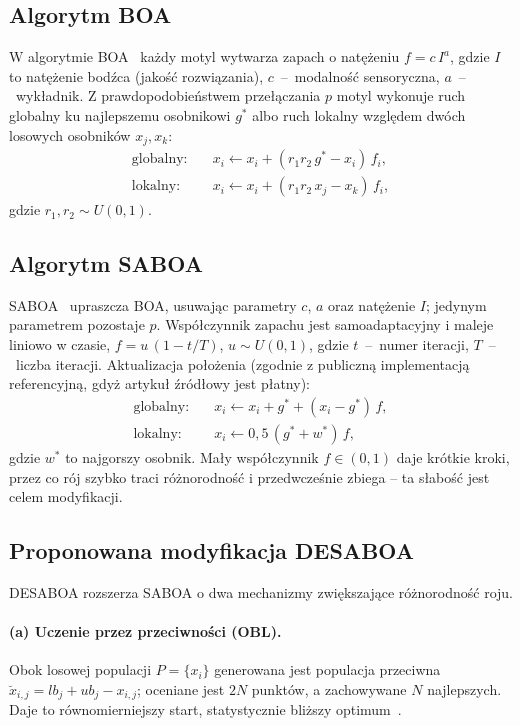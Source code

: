 \documentclass[12pt]{article}
\begin{document}
\subsection{Algorytm BOA}
W algorytmie BOA~\cite{boa} każdy motyl wytwarza zapach o natężeniu
$f = c\,I^{a}$, gdzie $I$ to natężenie bodźca (jakość rozwiązania), $c$~--~modalność
sensoryczna, $a$~--~wykładnik. Z prawdopodobieństwem przełączania $p$ motyl wykonuje
ruch globalny ku najlepszemu osobnikowi $g^{*}$ albo ruch lokalny względem dwóch
losowych osobników $x_j, x_k$:
\begin{align}
\text{globalny:}\quad & x_i \leftarrow x_i + (r_1 r_2\, g^{*} - x_i)\, f_i,\\
\text{lokalny:}\quad  & x_i \leftarrow x_i + (r_1 r_2\, x_j - x_k)\, f_i,
\end{align}
gdzie $r_1, r_2 \sim U(0,1)$.

\subsection{Algorytm SABOA}
SABOA~\cite{saboa} upraszcza BOA, usuwając parametry $c$, $a$ oraz natężenie $I$;
jedynym parametrem pozostaje $p$. Współczynnik zapachu jest samoadaptacyjny i maleje
liniowo w czasie, $f = u\,(1 - t/T)$, $u \sim U(0,1)$, gdzie $t$~--~numer iteracji,
$T$~--~liczba iteracji. Aktualizacja położenia (zgodnie z publiczną implementacją
referencyjną, gdyż artykuł źródłowy jest płatny):
\begin{align}
\text{globalny:}\quad & x_i \leftarrow x_i + g^{*} + (x_i - g^{*})\, f,\\
\text{lokalny:}\quad  & x_i \leftarrow 0{,}5\,(g^{*} + w^{*})\, f,
\end{align}
gdzie $w^{*}$ to najgorszy osobnik. Mały współczynnik $f\in(0,1)$ daje krótkie kroki,
przez co rój szybko traci różnorodność i przedwcześnie zbiega -- ta słabość jest celem
modyfikacji.

\subsection{Proponowana modyfikacja DESABOA}
DESABOA rozszerza SABOA o dwa mechanizmy zwiększające różnorodność roju.

\paragraph{(a) Uczenie przez przeciwności (OBL).}
Obok losowej populacji $P=\{x_i\}$ generowana jest populacja przeciwna
$\breve{x}_{i,j} = lb_j + ub_j - x_{i,j}$; oceniane jest $2N$ punktów, a zachowywane $N$
najlepszych. Daje to równomierniejszy start, statystycznie bliższy optimum~\cite{glpso}.
\end{document}
